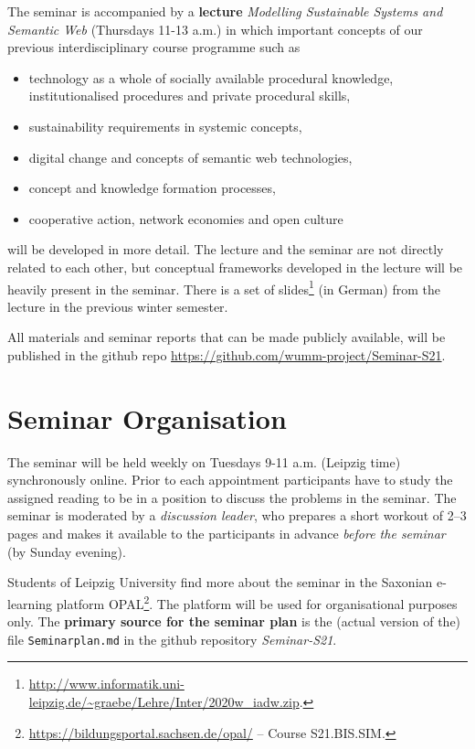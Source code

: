 \documentclass[11pt,a4paper]{article}
\begin{document}
The seminar is accompanied by a \textbf{lecture} \emph{Modelling Sustainable
  Systems and Semantic Web} (Thursdays 11-13 a.m.) in which important concepts
of our previous interdisciplinary course programme such as
\begin{itemize}[noitemsep]
\item technology as a whole of socially available procedural knowledge,
  institutionalised procedures and private procedural skills, 
\item sustainability requirements in systemic concepts,
\item digital change and concepts of semantic web technologies,
\item concept and knowledge formation processes,
\item cooperative action, network economies and open culture
\end{itemize}
will be developed in more detail. The lecture and the seminar are not directly
related to each other, but conceptual frameworks developed in the lecture will
be heavily present in the seminar. There is a set of
slides\footnote{\url{http://www.informatik.uni-leipzig.de/~graebe/Lehre/Inter/2020w_iadw.zip}. }
(in German) from the lecture in the previous winter semester.

All materials and seminar reports that can be made publicly available, will be
published in the github repo
\url{https://github.com/wumm-project/Seminar-S21}.

\section{Seminar Organisation}

The seminar will be held weekly on Tuesdays 9-11 a.m. (Leipzig time)
synchronously online.  Prior to each appointment participants have to study
the assigned reading to be in a position to discuss the problems in the
seminar.  The seminar is moderated by a \emph{discussion leader}, who prepares
a short workout of 2--3 pages and makes it available to the participants in
advance \emph{before the seminar} (by Sunday evening).

Students of Leipzig University find more about the seminar in the Saxonian
e-learning platform
OPAL\footnote{\url{https://bildungsportal.sachsen.de/opal/} -- Course
  S21.BIS.SIM.}.  The platform will be used for organisational purposes only.
The \textbf{primary source for the seminar plan} is the (actual version of
the) file \texttt{Seminarplan.md} in the github repository \emph{Seminar-S21}.
\end{document}
